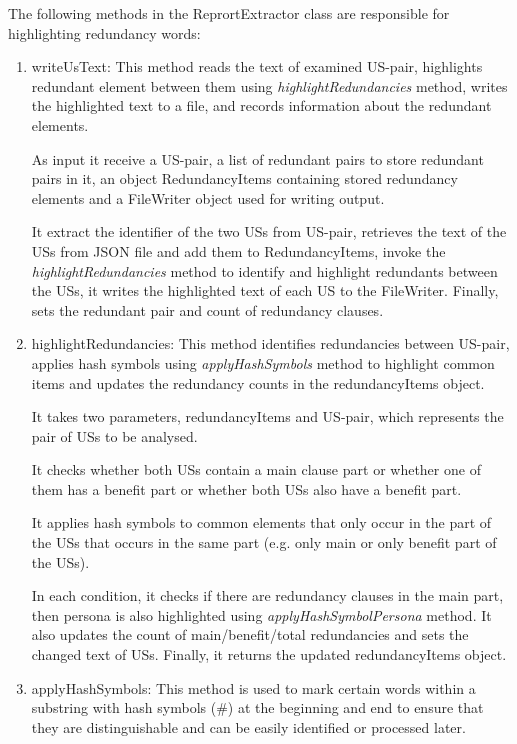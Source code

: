 The following methods in the ReprortExtractor class are responsible for highlighting redundancy words:
\begin{enumerate}
	\item writeUsText: This method reads the text of examined US-pair, highlights redundant element between them using \textit{highlightRedundancies} method, writes the highlighted text to a file, and records information about the redundant elements. 
	
	As input it receive a US-pair, a list of redundant pairs to store redundant pairs in it, an object RedundancyItems containing stored redundancy elements and a FileWriter object used for writing output.
	
	It extract the identifier of the two USs from US-pair, retrieves the text of the USs from JSON file and add them to RedundancyItems, invoke the \textit{highlightRedundancies} method to identify and highlight redundants between the USs, it writes the highlighted text of each US to the FileWriter. Finally, sets the redundant pair and count of redundancy clauses.
	\item highlightRedundancies: This method identifies redundancies between US-pair, applies hash symbols using \textit{applyHashSymbols} method to highlight common items and updates the redundancy counts in the redundancyItems object. 
	
	It takes two parameters, redundancyItems and US-pair, which represents the pair of USs to be analysed. 
	
	It checks whether both USs contain a main clause part or whether one of them has a benefit part or whether both USs also have a benefit part.
	
	It applies hash symbols to common elements that only occur in the part of the USs that occurs in the same part (e.g. only main or only benefit part of the USs). 
	
	In each condition, it checks if there are redundancy clauses in the main part, then persona is also highlighted using \textit{applyHashSymbolPersona} method. It also updates the count of main/benefit/total redundancies and sets the changed text of USs. Finally, it returns the updated redundancyItems object.
	\item applyHashSymbols: This method is used to mark certain words within a substring with hash symbols (\#) at the beginning and end to ensure that they are distinguishable and can be easily identified or processed later. 
	

\end{enumerate}
